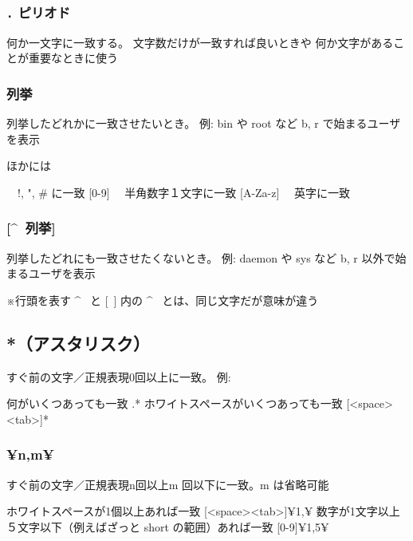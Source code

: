 \documentclass[mingoth,a4paper]{jsarticle}
\begin{document}
\subsubsection{{\tt .} ピリオド}

何か一文字に一致する。
文字数だけが一致すれば良いときや
何か文字があることが重要なときに使う

\subsubsection{列挙}

列挙したどれかに一致させたいとき。
例: bin や root など b, r で始まるユーザを表示
\begin{commandline}
\end{commandline}
ほかには
\begin{commandline}
        [! " \# ] 　!, ", \# に一致
        [0-9] 　半角数字１文字に一致
        [A-Za-z] 　英字に一致
\end{commandline}

\subsubsection{[\^~列挙]}

列挙したどれにも一致させたくないとき。
例: daemon や sys など b, r 以外で始まるユーザを表示 
\begin{commandline}
\end{commandline}
※行頭を表す \^~ と [~] 内の \^~ とは、同じ文字だが意味が違う

\subsection{*（アスタリスク）}

すぐ前の文字／正規表現0回以上に一致。
例:
\begin{commandline}
    何がいくつあっても一致
      .* 
    ホワイトスペースがいくつあっても一致
      [<space><tab>]* 
\end{commandline}

\subsubsection{¥{n,m¥}}

すぐ前の文字／正規表現n回以上m 回以下に一致。m は省略可能
\begin{commandline}
    ホワイトスペースが1個以上あれば一致
    [<space><tab>]¥{1,¥} 
    数字が1文字以上５文字以下（例えばざっと short の範囲）あれば一致
    [0-9]¥{1,5¥} 
\end{commandline}
\end{document}
